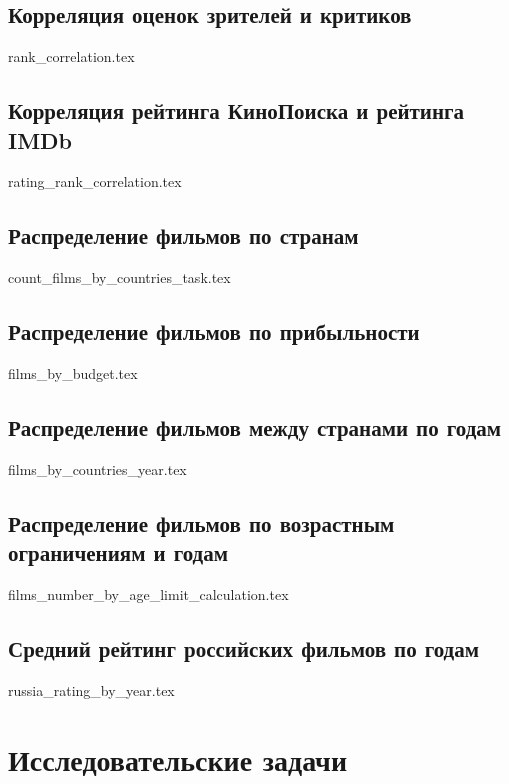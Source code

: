 \documentclass[conference]{IEEEtran}
\begin{document}
\subsection{Корреляция оценок зрителей и критиков}

{rank_correlation.tex}

\subsection{Корреляция рейтинга КиноПоиска и рейтинга IMDb}

{rating_rank_correlation.tex}

\subsection{Распределение фильмов по странам}

{count_films_by_countries_task.tex}

\subsection{Распределение фильмов по прибыльности}

{films_by_budget.tex}

\subsection{Распределение фильмов между странами по годам}

{films_by_countries_year.tex}

\subsection{Распределение фильмов по возрастным ограничениям и годам}

{films_number_by_age_limit_calculation.tex}

\subsection{Средний рейтинг российских фильмов по годам}

{russia_rating_by_year.tex}

\section{Исследовательские задачи}
\end{document}
